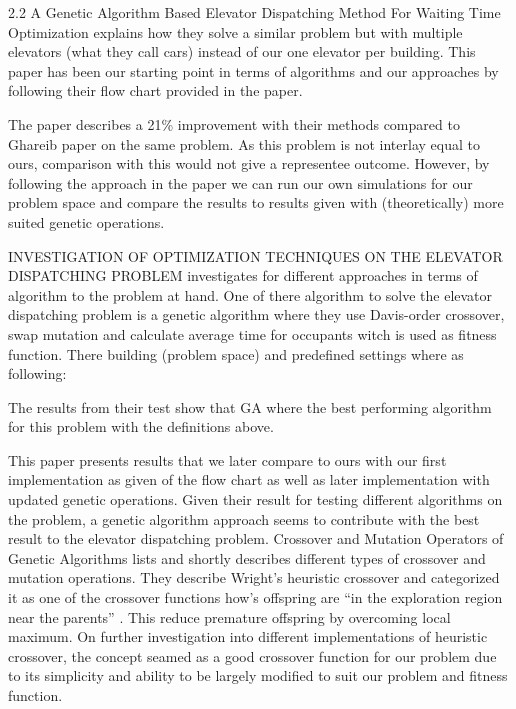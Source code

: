2.2 
A Genetic Algorithm Based Elevator Dispatching Method For Waiting Time Optimization \cite{tartan2016genetic} explains how they solve a similar problem but with multiple elevators (what they call cars) instead of our one elevator per building. This paper has been our starting point in terms of algorithms and our approaches by following their flow chart provided in the paper.  
 
The paper describes a 21\% improvement with their methods compared to Ghareib paper \cite{gharieb2005optimal} on the same problem. As this problem is not interlay equal to ours, comparison with this would not give a representee outcome. However, by following the approach in the paper we can run our own simulations for our problem space and compare the results to results given with (theoretically) more suited genetic operations.

INVESTIGATION OF OPTIMIZATION TECHNIQUES ON THE ELEVATOR DISPATCHING PROBLEM \cite{ahmed2022investigation} investigates for different approaches in terms of algorithm to the problem at hand.  One of there algorithm to solve the elevator dispatching problem is a genetic algorithm where they use Davis-order crossover, swap mutation and calculate average time for occupants  witch is used as fitness function. There building (problem space) and predefined settings where as following: 
  
The results from their test show that GA where the best performing algorithm for this problem with the definitions above. 
 
This paper presents results that we later compare to ours with our first implementation as given of the flow chart\cite{tartan2016genetic} as well as later implementation with updated genetic operations. Given their result for testing different algorithms on the problem, a genetic algorithm approach seems to contribute with the best result to the elevator dispatching problem.
Crossover and Mutation Operators of Genetic Algorithms \cite{ahmed2022investigation} lists and shortly describes different types of crossover and mutation operations. They describe Wright's heuristic crossover and categorized it as one of the crossover functions how’s offspring are “in the exploration region near the parents” \cite{ahmed2022investigation}. This reduce premature offspring by overcoming local maximum. On further investigation into different implementations of heuristic crossover, the concept seamed as a good crossover function for our problem due to its simplicity and ability to be largely modified to suit our problem and fitness function.



